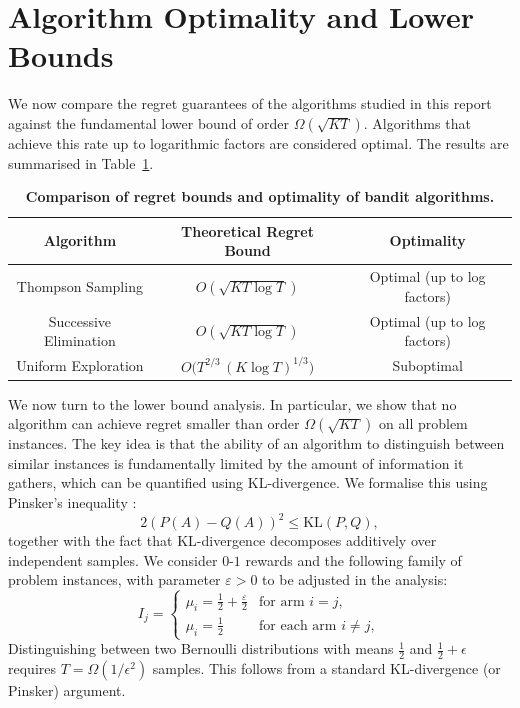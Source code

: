 \documentclass[12pt]{article}
\begin{document}
\section{Algorithm Optimality and Lower Bounds}

We now compare the regret guarantees of the algorithms studied in this report against the fundamental lower bound of order $\Omega(\sqrt{KT})$. Algorithms that achieve this rate up to logarithmic factors are considered optimal. The results are summarised in Table~\ref{tab:regret_bounds}.

\begin{table}[H]
\centering
\begin{tabular}{|c|c|c|}
\hline
\textbf{Algorithm} & \textbf{Theoretical Regret Bound} & \textbf{Optimality} \\
\hline
Thompson Sampling & $O(\sqrt{KT \log T})$ & Optimal (up to log factors) \\
Successive Elimination & $O(\sqrt{KT \log T})$ & Optimal (up to log factors) \\
Uniform Exploration & $ O\Big( T^{2/3} \,(K \log T)^{1/3} \Big)$ & Suboptimal \\
\hline
\end{tabular}
\caption{\textbf{Comparison of regret bounds and optimality of bandit algorithms.}}
\label{tab:regret_bounds}
\end{table}



We now turn to the lower bound analysis. In particular, we show that no algorithm can achieve regret smaller than order $\Omega(\sqrt{KT})$ on all problem instances. The key idea is that the ability of an algorithm to distinguish between similar instances is fundamentally limited by the amount of information it gathers, which can be quantified using KL-divergence. We formalise this using Pinsker's inequality \cite{canonne2023shortnoteinequalitykl}:
\[
2(P(A)-Q(A))^2 \le \mathrm{KL}(P,Q),
\]
together with the fact that KL-divergence decomposes additively over independent samples. We consider $0$-$1$ rewards and the following family of problem instances, with parameter $\varepsilon > 0$ to be adjusted in the analysis:
\[
I_j =
\begin{cases}
\mu_i = \frac{1}{2} + \frac{\varepsilon}{2} & \text{for arm } i = j, \\
\mu_i = \frac{1}{2} & \text{for each arm } i \neq j,
\end{cases}
\label{eq:prob-instance}
\tag{4.1}
\]
Distinguishing between two Bernoulli distributions with means
\(\tfrac{1}{2}\) and \(\tfrac{1}{2}+\epsilon\) requires
\(T = \Omega(1/\epsilon^2)\) samples. This follows from a standard
KL-divergence (or Pinsker) argument.
\end{document}
